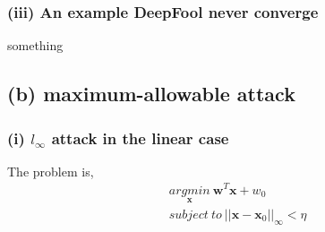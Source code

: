 \documentclass[11pt]{article}
\begin{document}
\subsubsection*{(iii) An example DeepFool never converge}
something
\subsection*{(b) maximum-allowable attack}
\subsubsection*{(i) $l_\infty$ attack in the linear case}
The problem is,
\begin{equation}
\begin{split}
&\underset{\pmb{x}}{argmin}\ \pmb{w}^T\pmb{x}+w_0\\
&subject\ to\ ||\pmb{x}-\pmb{x}_0||_\infty<\eta
\end{split}
\end{equation}
\end{document}
